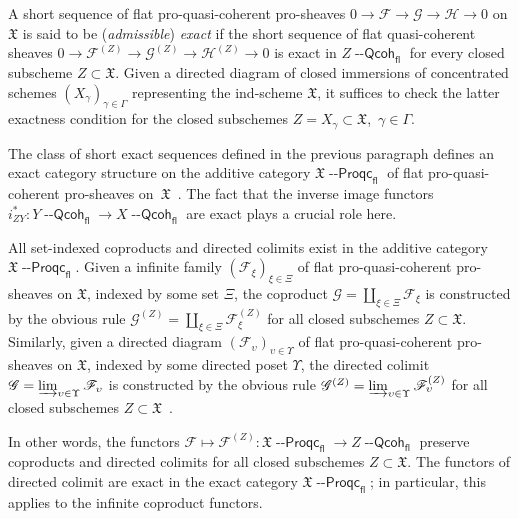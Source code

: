 \documentclass[12pt,a4paper]{amsart}
\newcommand{\+}{\protect\nobreakdash-}
\renewcommand{\:}{\colon}
\newcommand{\rarrow}{\longrightarrow}
\newcommand{\Qcoh}{{\operatorname{\mathsf{--Qcoh}}}}
\newcommand{\Proqc}{{\operatorname{\mathsf{--Proqc}}}}
\newcommand{\fl}{\mathsf{fl}}
\newcommand{\fX}{\mathfrak X}
\newcommand{\rF}{\mathscr F}
\newcommand{\rG}{\mathscr G}
\newcommand{\rH}{\mathscr H}
\theoremstyle{plain}
\theoremstyle{definition}
\begin{document}
 A short sequence of flat pro-quasi-coherent pro-sheaves $0\rarrow\rF
\rarrow\rG\rarrow\rH\rarrow0$ on $\fX$ is said to be (\emph{admissible})
\emph{exact} if the short sequence of flat quasi-coherent sheaves
$0\rarrow\rF^{(Z)}\rarrow\rG^{(Z)}\rarrow\rH^{(Z)}\rarrow0$ is exact
in $Z\Qcoh_\fl$ for every closed subscheme $Z\subset\fX$.
 Given a directed diagram of closed immersions of concentrated schemes
$(X_\gamma)_{\gamma\in\Gamma}$ representing the ind-scheme $\fX$, it
suffices to check the latter exactness condition for the closed
subschemes $Z=X_\gamma\subset\fX$, \,$\gamma\in\Gamma$.

 The class of short exact sequences defined in the previous paragraph
defines an exact category structure on the additive category
$\fX\Proqc_\fl$ of flat pro-quasi-coherent pro-sheaves on~$\fX$
\,\cite[Proposition~3.5]{Psemten}.
 The fact that the inverse image functors $i_{ZY}^*\:Y\Qcoh_\fl\rarrow
X\Qcoh_\fl$ are exact plays a crucial role here.

 All set-indexed coproducts and directed colimits exist in the additive
category $\fX\Proqc_\fl$.
 Given a infinite family $(\rF_\xi)_{\xi\in\Xi}$ of flat
pro-quasi-coherent pro-sheaves on $\fX$, indexed by some set $\Xi$,
the coproduct $\rG=\coprod_{\xi\in\Xi}\rF_\xi$ is constructed by
the obvious rule $\rG^{(Z)}=\coprod_{\xi\in\Xi}\rF_\xi^{(Z)}$ for all
closed subschemes $Z\subset\fX$.
 Similarly, given a directed diagram
$(\rF_\upsilon)_{\upsilon\in\Upsilon}$ of flat pro-quasi-coherent
pro-sheaves on $\fX$, indexed by some directed poset $\Upsilon$,
the directed colimit $\rG=\varinjlim_{\upsilon\in\Upsilon}\rF_\upsilon$
is constructed by the obvious rule
$\rG^{(Z)}=\varinjlim_{\upsilon\in\Upsilon}\rF_\upsilon^{(Z)}$ for
all closed subschemes $Z\subset\fX$ \,\cite[Section~3.5]{Psemten}.

 In other words, the functors $\rF\longmapsto\rF^{(Z)}\:
\fX\Proqc_\fl\rarrow Z\Qcoh_\fl$ preserve coproducts and directed
colimits for all closed subschemes $Z\subset\fX$.
 The functors of directed colimit are exact in the exact
category $\fX\Proqc_\fl$; in particular, this applies to
the infinite coproduct functors.
\end{document}
